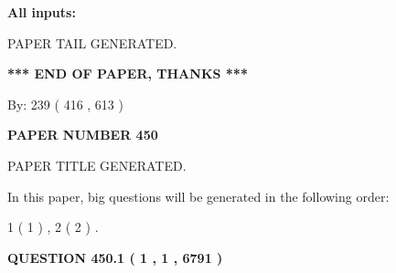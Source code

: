 \documentclass[12pt]{article}
\begin{document}
   
   
   
\noindent{}
   
   
   
   
\noindent\vspace{0.1in}\hspace{-0.08in} {\textbf{\Large{All inputs: }}}
   
   
   
   
   
   
 \vspace{0.2in}
 
   
   
\vspace{2.0in} PAPER TAIL GENERATED.
   
   
   
   
\vspace{1.0in} 
{\textbf{\large{ *** END OF PAPER, THANKS *** }}} 
   
   
\hspace{1.0in} By: 
 239 ( 416 ,  613 )
   
   
   
   
\newpage 
\setcounter{page}{ 
   450001 } 
   
   
   
   
 {\textbf{ \Large{ PAPER NUMBER  450  }}}
   
   
\vspace{0.2in}
   
   
   
   
   
   
   
   
 \vspace{0.2in}
 
 
 
 
   
   
 PAPER TITLE GENERATED.
   
   
   
\vspace{0.2in}
   
In this paper, big questions will be generated in the following order: 
   
   
   1 ( 1 )
 ,
   2 ( 2 )
 .
  
\vspace{0.2in}
  
{\textbf{\Large{QUESTION
450.1 
 ( 1 , 1 , 6791 )
}}}
  
\end{document}
